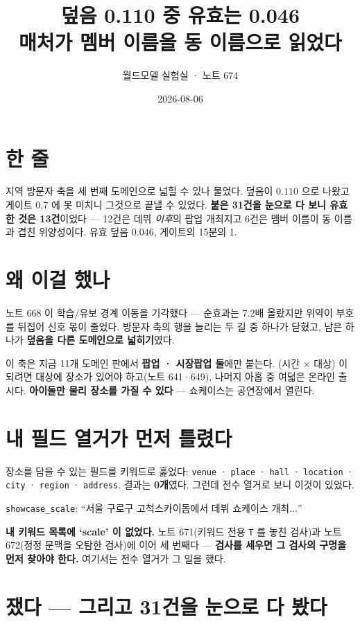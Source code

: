 \documentclass[10pt,a4paper]{article}
\title{\bfseries 덮음 0.110 중 유효는 0.046\\[2pt]
\large 매처가 멤버 이름을 동 이름으로 읽었다}
\author{월드모델 실험실 · 노트 674}
\date{2026-08-06}
\begin{document}
\maketitle

\section{한 줄}

지역 방문자 축을 세 번째 도메인으로 넓힐 수 있나 물었다. 덮음이 $0.110$ 으로 나왔고
게이트 $0.7$ 에 못 미치니 그것으로 끝낼 수 있었다. \textbf{붙은 31건을 눈으로 다 보니
유효한 것은 13건}이었다 --- 12건은 데뷔 \emph{이후}의 팝업 개최지고 6건은 멤버 이름이
동 이름과 겹친 위양성이다. 유효 덮음 $\mathbf{0.046}$, 게이트의 15분의 1.

\section{왜 이걸 했나}

노트 668 이 학습/유보 경계 이동을 기각했다 --- 순효과는 7.2배 올랐지만 위약이 부호를
뒤집어 신호 몫이 줄었다. 방문자 축의 행을 늘리는 두 길 중 하나가 닫혔고, 남은 하나가
\textbf{덮음을 다른 도메인으로 넓히기}였다.

이 축은 지금 11개 도메인 판에서 \textbf{팝업 · 시장팝업 둘}에만 붙는다. (시간 $\times$
대상) 이 되려면 대상에 장소가 있어야 하고(노트 641·649), 나머지 아홉 중 여덟은 온라인
출시다. \textbf{아이돌만 물리 장소를 가질 수 있다} --- 쇼케이스는 공연장에서 열린다.

\section{내 필드 열거가 먼저 틀렸다}

장소를 담을 수 있는 필드를 키워드로 훑었다: \verb|venue| · \verb|place| · \verb|hall| ·
\verb|location| · \verb|city| · \verb|region| · \verb|address|. 결과는
\textbf{0개}였다. 그런데 전수 열거로 보니 이것이 있었다.

\begin{center}
\verb|showcase_scale|:
``서울 구로구 고척스카이돔에서 데뷔 쇼케이스 개최$\ldots$''
\end{center}

\textbf{내 키워드 목록에 `scale' 이 없었다.} 노트 671(키워드 전용 \texttt{T} 를 놓친
검사)과 노트 672(정정 문맥을 오탐한 검사)에 이어 세 번째다 --- \textbf{검사를 세우면
그 검사의 구멍을 먼저 찾아야 한다.} 여기서는 전수 열거가 그 일을 했다.

\section{쟀다 --- 그리고 31건을 눈으로 다 봤다}
\end{document}

